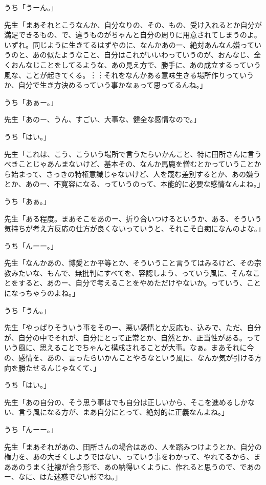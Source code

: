 \documentclass[b5j,twoside,twocolumn]{utarticle}
\begin{document}
\begin{description}
\item うち「うーん。」
\item 先生「まあそれとこうなんか、自分なりの、その、もの、受け入れるとか自分が満足できるもの、で、違うものがちゃんと自分の周りに用意されてしまうのよ。いずれ。同じように生きてるはずやのに、なんかあのー、絶対あんなん嫌っていうのと、あの似たようなこと、自分はこれがいいわっていうのが、おんなじ、全くおんなじことをしてるような、あの見え方で、勝手に、あの成立するっていう風な、ことが起きてくる。︙︙それをなんかある意味生きる場所作りっていうか、自分で生き方決めるっていう事かなぁって思ってるんね。」
\item うち「あぁー。」
\item 先生「あのー、うん、すごい、大事な、健全な感情なので。」
\item うち「はい。」
\item 先生「これは、こう、こういう場所で言うたらいかんこと、特に田所さんに言うべきことじゃあんまないけど、基本その、なんか馬鹿を憎むとかっていうことから始まって、さっきの特権意識じゃないけど、人を蔑む差別するとか、あの嫌うとか、あのー、不寛容になる、っていうのって、本能的に必要な感情なんよね。」
\item うち「あぁ。」
\item 先生「ある程度。まあそこをあのー、折り合いつけるというか、ある、そういう気持ちが考え方反応の仕方が良くないっていうと、それこそ白痴になんのよな。」
\item うち「んーー。」
\item 先生「なんかあの、博愛とか平等とか、そういうこと言うてはみるけど、その宗教みたいな、もんで、無批判にすべてを、容認しよう、っていう風に、そんなことをすると、あのー、自分で考えることをやめただけやないか。っていう、ことになっちゃうのよね。」
\item うち「うん。」
\item 先生「やっぱりそういう事をそのー、悪い感情とか反応も、込みで、ただ、自分が、自分の中でそれが、自分にとって正常とか、自然とか、正当性がある。っていう風に、思えることでちゃんと構成されることが大事。なぁ。まあそれに今の、感情を、あの、言ったらいかんことやろなという風に、なんか気が引ける方向を勝たせるんじゃなくて、」
\item うち「はい。」
\item 先生「あの自分の、そう思う事はでも自分は正しいから、そこを進めるしかない、言う風になる方が、まあ自分にとって、絶対的に正義なんよね。」
\item うち「んーー。」
\item 先生「まあそれがあの、田所さんの場合はあの、人を踏みつけようとか、自分の権力を、あの大きくしようではない、っていう事をわかって、やれてるから、まああのうまく辻褄が合う形で、あの納得いくように、作れると思うので、であのー、なに、はた迷惑でない形でね。」

\end{description}
\end{document}
